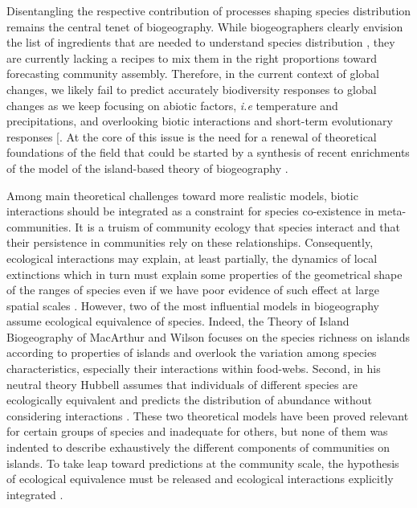 Disentangling the respective contribution of processes shaping species
distribution remains the central tenet of biogeography. While
biogeographers clearly envision the list of ingredients that are needed
to understand species distribution \citep{Thuiller2013}, they are
currently lacking a recipes to mix them in the right proportions toward
forecasting community assembly. Therefore, in the current context of
global changes, we likely fail to predict accurately biodiversity
responses to global changes as we keep focusing on abiotic factors,
\emph{i.e} temperature and precipitations, and overlooking biotic
interactions and short-term evolutionary responses
{[}\citet{Lavergne2010}. At the core of this issue is the need for a
renewal of theoretical foundations of the field that could be started by
a synthesis of recent enrichments of the model of the island-based
theory of biogeography \citep{Lomolino2000a, Warren2015}.

Among main theoretical challenges toward more realistic models, biotic
interactions should be integrated as a constraint for species
co-existence in meta-communities. It is a truism of community ecology
that species interact and that their persistence in communities rely on
these relationships. Consequently, ecological interactions may explain,
at least partially, the dynamics of local extinctions which in turn must
explain some properties of the geometrical shape of the ranges of
species \citep{Holt2009, Cazelles2015b} even if we have poor evidence of
such effect at large spatial scales \citep[but see][]{Gotelli2010}.
However, two of the most influential models in biogeography assume
ecological equivalence of species. Indeed, the Theory of Island
Biogeography of MacArthur and Wilson \citep[hereafter
TIB,][]{MacArthur1967} focuses on the species richness on islands
according to properties of islands and overlook the variation among
species characteristics, especially their interactions within food-webs.
Second, in his neutral theory Hubbell assumes that individuals of
different species are ecologically equivalent and predicts the
distribution of abundance without considering interactions
\citep{Hubbell1997}. These two theoretical models have been proved
relevant for certain groups of species and inadequate for others, but
none of them was indented to describe exhaustively the different
components of communities on islands. To take leap toward predictions at
the community scale, the hypothesis of ecological equivalence must be
released and ecological interactions explicitly integrated
\citep{Holt2010}.

